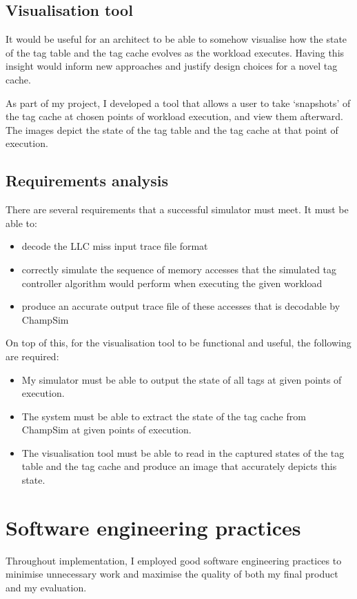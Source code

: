 \subsection{Visualisation tool}
It would be useful for an architect to be able to somehow visualise how the state of the tag table and the tag cache evolves as the workload executes. Having this insight would inform new approaches and justify design choices for a novel tag cache.

As part of my project, I developed a tool that allows a user to take `snapshots' of the tag cache at chosen points of workload execution, and view them afterward. The images depict the state of the tag table and the tag cache at that point of execution.

\subsection{Requirements analysis}
There are several requirements that a successful simulator must meet. It must be able to:
\begin{itemize}
	\item decode the LLC miss input trace file format
	\item correctly simulate the sequence of memory accesses that the simulated tag controller algorithm would perform when executing the given workload
	\item produce an accurate output trace file of these accesses that is decodable by ChampSim
\end{itemize}

On top of this, for the visualisation tool to be functional and useful, the following are required:
\begin{itemize}
	\item My simulator must be able to output the state of all tags at given points of execution.
	\item The system must be able to extract the state of the tag cache from ChampSim at given points of execution.
	\item The visualisation tool must be able to read in the captured states of the tag table and the tag cache and produce an image that accurately depicts this state.
\end{itemize}

\section{Software engineering practices}
 Throughout implementation, I employed good software engineering practices to minimise unnecessary work and maximise the quality of both my final product and my evaluation.

